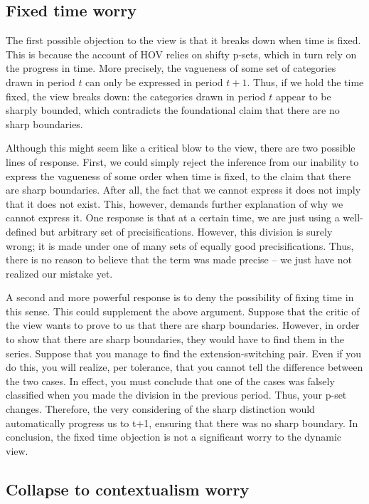 \subsection{Fixed time worry}

The first possible objection to the view is that it breaks down when
time is fixed. This is because the account of HOV relies on shifty
p-sets, which in turn rely on the progress in time. More precisely, the
vagueness of some set of categories drawn in period $t$ can only be
expressed in period $t+1$. Thus, if we hold the time fixed, the
view breaks down: the categories drawn in period $t$ appear to be
sharply bounded, which contradicts the foundational claim that there are
no sharp boundaries.

Although this might seem like a critical blow to the view, there are two
possible lines of response. First, we could simply reject the inference
from our inability to express the vagueness of some order when time is
fixed, to the claim that there are sharp boundaries. After all, the fact
that we cannot express it does not imply that it does not exist. This,
however, demands further explanation of why we cannot express it. One
response is that at a certain time, we are just using a well-defined but
arbitrary set of precisifications. However, this division is surely
wrong; it is made under one of many sets of equally good
precisifications. Thus, there is no reason to believe that the term was
made precise -- we just have not realized our mistake yet.

A second and more powerful response is to deny the possibility of fixing
time in this sense. This could supplement the above argument. Suppose
that the critic of the view wants to prove to us that there are sharp
boundaries. However, in order to show that there are sharp boundaries,
they would have to find them in the series. Suppose that you manage to
find the extension-switching pair. Even if you do this, you will
realize, per tolerance, that you cannot tell the difference between the
two cases. In effect, you must conclude that one of the cases was
falsely classified when you made the division in the previous period.
Thus, your p-set changes. Therefore, the very considering of the sharp
distinction would automatically progress us to t+1, ensuring that there
was no sharp boundary. In conclusion, the fixed time objection is not a
significant worry to the dynamic view.

\subsection{Collapse to contextualism worry}

